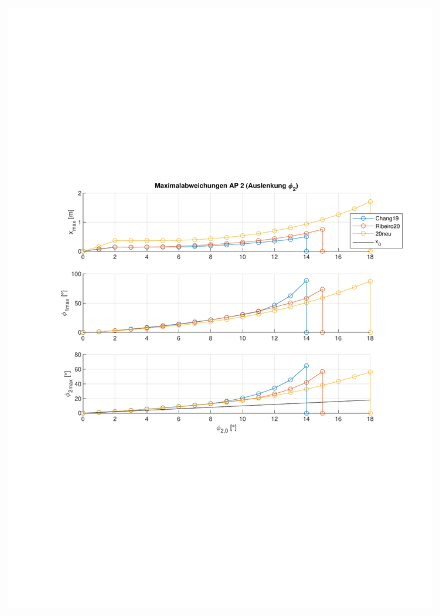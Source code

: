 \begin{figure}
	\centering
	\begin{minipage}[t]{0.45\linewidth}
		\centering
		\includegraphics[scale=0.5]{Bilder/Parameter neu (Ribeiro) Creg off/AP2.pdf}
		\label{fig:ap2}
	\end{minipage}
	\hfill
	\begin{minipage}[t]{0.45\linewidth}
		\centering

\end{minipage}
\end{figure}
